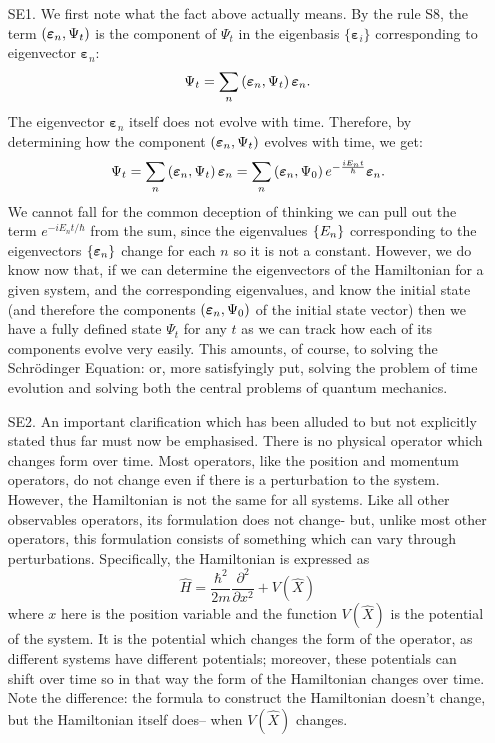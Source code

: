 \begin{enumerate}
    \item[SE1.] We first note what the fact above actually means. By the rule S8, the term $\left(\bm{\varepsilon}_{n},\Psi_{t}\right)$ is the component of $\Psi_{t}$ in the eigenbasis $\{\bm{\varepsilon}_{i}\}$ corresponding to eigenvector  $\bm{\varepsilon}_{n}$:
    $$
    \Psi_{t}=\sum_{n}\left(\bm{\varepsilon}_{n},\Psi_{t}\right)\bm{\varepsilon}_{n}.
    $$
    The eigenvector $\bm{\varepsilon}_{n}$ itself does not evolve with time. Therefore, by determining how the component $\left(\bm{\varepsilon}_{n},\Psi_{t}\right)$ evolves with time, we get:
    $$
    \Psi_{t}=\sum_{n}\left(\bm{\varepsilon}_{n},\Psi_{t}\right)\bm{\varepsilon}_{n}=\sum_{n}\left(\bm{\varepsilon}_{n},\Psi_{0}\right)e^{-\frac{iE_{n}t}{\hbar}}\bm{\varepsilon}_{n}.
    $$
    We cannot fall for the common deception of thinking we can pull out the term $e^{-{iE_{n}t}/{\hbar}}$ from the sum, since the eigenvalues $\{E_{n}\}$ corresponding to the eigenvectors $\{\bm{\varepsilon}_{n}\}$ change for each $n$ so it is not a constant. However, we do know now that, if we can determine the eigenvectors of the Hamiltonian for a given system, and the corresponding eigenvalues, and know the initial state (and therefore the components $\left(\bm{\varepsilon}_{n},\Psi_{0}\right)$ of the initial state vector) then we have a fully defined state $\Psi_{t}$ for any $t$ as we can track how each of its components evolve very easily. This amounts, of course, to solving the Schr\"{o}dinger Equation: or, more satisfyingly put, solving the problem of time evolution and solving both the central problems of quantum mechanics.
    \item[SE2.] An important clarification which has been alluded to but not explicitly stated thus far must now be emphasised. There is no physical operator which changes form over time. Most operators, like the position and momentum operators, do not change even if there is a perturbation to the system. However, the Hamiltonian is not the same for all systems. Like all other observables operators, its formulation does not change- but, unlike most other operators, this formulation consists of something which can vary through perturbations. Specifically, the Hamiltonian is expressed as 
    $$
    \hat{H}=\frac{\hbar^{2}}{2m}\frac{\partial^2}{\partial x^2}+V(\hat{X})
    $$
    where $x$ here is the position variable and the function $V(\hat{X})$ is the potential of the system. It is the potential which changes the form of the operator, as different systems have different potentials; moreover, these potentials can shift over time so in that way the form of the Hamiltonian changes over time. Note the difference: the formula to construct the Hamiltonian doesn't change, but the Hamiltonian itself does-- when $V(\hat{X})$ changes. 

\end{enumerate}
